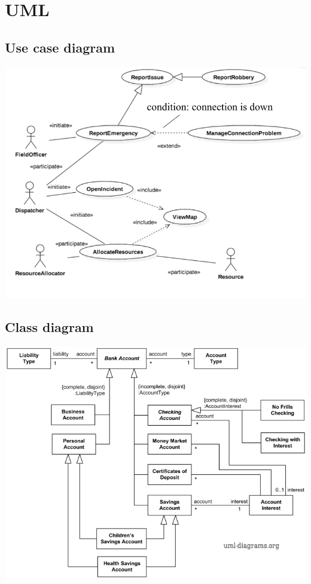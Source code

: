 \section{UML}
\subsection{Use case diagram}
\includegraphics[width=\linewidth]{4-uml/use-case.png}

\subsection{Class diagram}
\includegraphics[width=\linewidth]{4-uml/class.png}


